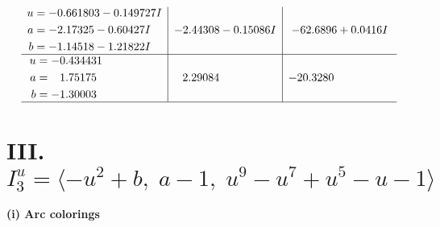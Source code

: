 \documentclass[1p]{elsarticle_modified}
\theoremstyle{definition}
\begin{document}
$$\begin{array}{c|c|c}
\begin{aligned}
u &= -0.661803 - 0.149727 I \\
a &= -2.17325 - 0.60427 I \\
b &= -1.14518 - 1.21822 I\end{aligned}
 & -2.44308 - 0.15086 I & -62.6896 + 0.0416 I \\ \hline\begin{aligned}
u &= -0.434431\phantom{ +0.000000I} \\
a &= \phantom{-}1.75175\phantom{ +0.000000I} \\
b &= -1.30003\phantom{ +0.000000I}\end{aligned}
 & \phantom{-}2.29084\phantom{ +0.000000I} & -20.3280\phantom{ +0.000000I}\\
 \hline 
 \end{array}$$\newpage\newpage\renewcommand{\arraystretch}{1}
\centering \section*{III. $I^u_{3}= \langle - u^2+b,\;a-1,\;u^9- u^7+u^5- u-1 \rangle$}
\flushleft \textbf{(i) Arc colorings}\\
\end{document}
